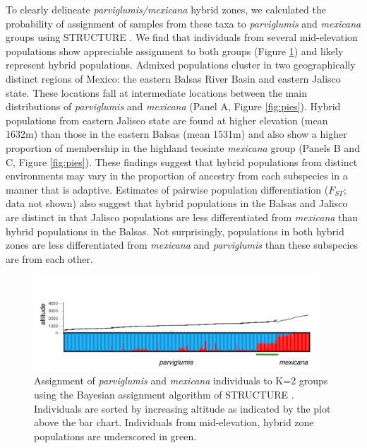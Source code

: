To clearly delineate \emph{parviglumis/mexicana} hybrid zones, we calculated the probability of assignment of samples from these taxa to \emph{parviglumis} and \emph{mexicana} groups using STRUCTURE \citep{Pritchard2000}.  We find that individuals from several mid-elevation populations show appreciable assignment to both groups (Figure \ref{fig:structure}) and likely represent hybrid populations.  
Admixed populations cluster in two geographically distinct regions of Mexico: the eastern Balsas River Basin and eastern Jalisco state.
These locations fall at intermediate locations between the main distributions of \emph{parviglumis} and \emph{mexicana} (Panel A, Figure \ref{fig:pies}).
Hybrid populations from eastern Jalisco state are found at higher elevation (mean 1632m) than those in the eastern Balsas (mean 1531m) and also show a higher proportion of membership in the highland teosinte \emph{mexicana} group (Panels B and C, Figure \ref{fig:pies}).
These findings suggest that hybrid populations from distinct environments may vary in the proportion of ancestry from each subspecies in a manner that is adaptive.
Estimates of pairwise population differentiation ($F_{ST}$; data not shown) also suggest that hybrid populations in the Balsas and Jalisco are distinct in that Jalisco populations are less differentiated from \emph{mexicana} than hybrid populations in the Balsas.  Not surprisingly, populations in both hybrid zones are less differentiated from \emph{mexicana} and \emph{parviglumis} than these subspecies are from each other.

\begin{figure}[h!] 
  \centering
   \includegraphics[width=0.95\textwidth]{structure.pdf}
    \caption{Assignment of \emph{parviglumis} and \emph{mexicana} individuals to K=2 groups using the Bayesian assignment algorithm of STRUCTURE \citep{Pritchard2000}.  Individuals are sorted by increasing altitude as indicated by the plot above the bar chart. Individuals from mid-elevation, hybrid zone populations are underscored in green.} 
\label{fig:structure}
\end{figure}

